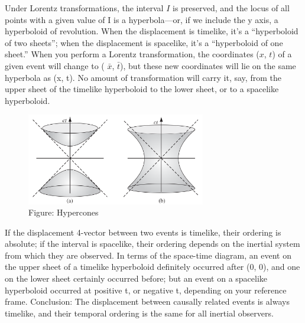 \documentclass[../main.tex]{subfiles}
\begin{document}
Under Lorentz transformations, the interval $I$ is preserved, and the locus of all points with a given value of I is a hyperbola—or, if we include the y axis, a hyperboloid of revolution. When the displacement is timelike, it's a “hyperboloid of two sheets”; when the displacement is spacelike, it's a “hyperboloid of one sheet.” When you perform a Lorentz transformation, the coordinates ($x$, $t$) of a given event will change to ( $\bar{x}$, $\bar{t}$), but these new coordinates will lie on the same hyperbola as (x, t). No amount of transformation will carry it, say, from the upper sheet of the timelike hyperboloid to the lower sheet, or to a spacelike hyperboloid.
\begin{figure}
    \centering
    \includegraphics[height=4cm]{../Rss/Relativity/Hypercones.png}
    \caption*{Figure: Hypercones}
\end{figure}

If the displacement 4-vector between two events is timelike, their ordering is absolute; if the interval is spacelike, their ordering depends on the inertial system from which they are observed. In terms of the space-time diagram, an event on the upper sheet of a timelike hyperboloid definitely occurred after (0, 0), and one on the lower sheet certainly occurred before; but an event on a spacelike hyperboloid occurred at positive t, or negative t, depending on your reference frame. Conclusion: The displacement between causally related events is always timelike, and their temporal ordering is the same for all inertial observers.
\end{document}
